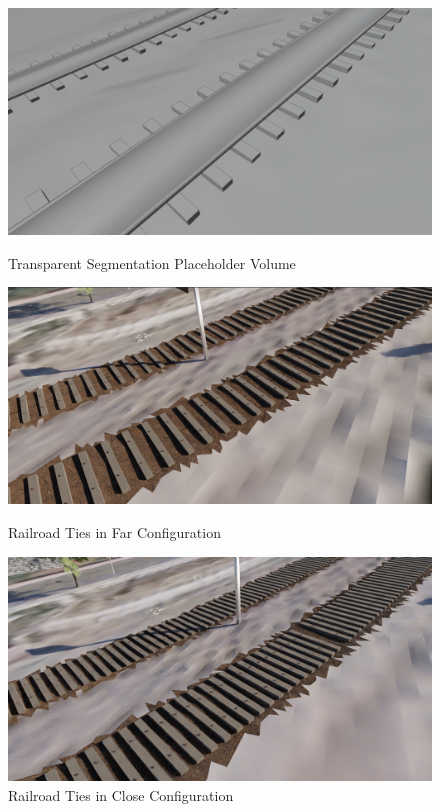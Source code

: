 \begin{figure}[!htb]
   \begin{minipage}{0.3\textwidth}
     \centering
     \includegraphics[width=.97\linewidth]{src/img/procedural-tracks/3c-matte-view.png}
     \caption{Transparent Segmentation Placeholder Volume}
     \label{fig:track-transparent-segmentation-placeholder}
   \end{minipage}\hfill
   \begin{minipage}{0.3\textwidth}
     \centering
     \includegraphics[width=\linewidth]{src/img/procedural-tracks/2b-planks-far.png}
     \caption{Railroad Ties in Far Configuration}
     \label{fig:wood-far}
   \end{minipage}\hfill
   \begin{minipage}{0.3\textwidth}
     \centering
     \includegraphics[width=.97\linewidth]{src/img/procedural-tracks/2a-planks-bolts-close.png}
     \caption{Railroad Ties in Close Configuration}
     \label{fig:wood-close}
   \end{minipage}
\end{figure}



